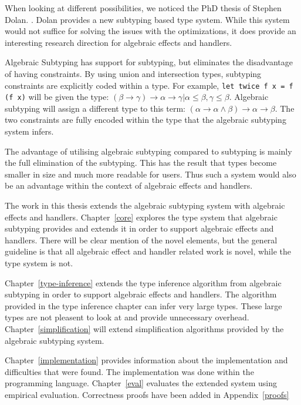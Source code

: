 When looking at different possibilities, we noticed the PhD thesis of Stephen Dolan. \cite{dolan2017algebraic}. Dolan provides a new subtyping based type system. While this system would not suffice for solving the issues with the optimizations, it does provide an interesting research direction for algebraic effects and handlers. 

Algebraic Subtyping has support for subtyping, but eliminates the disadvantage of having constraints. By using union and intersection types, subtyping constraints are explicitly coded within a type. For example, \lstinline{let twice f x = f (f x)} will be given the type: $(\beta \to \gamma) \to \alpha \to \gamma | \alpha \le \beta, \gamma \le \beta$. Algebraic subtyping will assign a different type to this term: $(\alpha \to \alpha \land \beta) \to \alpha \to \beta$. The two constraints are fully encoded within the type that the algebraic subtyping system infers. 

The advantage of utilising algebraic subtyping compared to subtyping is mainly the full elimination of the subtyping. This has the result that types become smaller in size and much more readable for users. Thus such a system would also be an advantage within the context of algebraic effects and handlers. 

The work in this thesis extends the algebraic subtyping system with algebraic effects and handlers. Chapter~\ref{core} explores the type system that algebraic subtyping provides and extends it in order to support algebraic effects and handlers. There will be clear mention of the novel elements, but the general guideline is that all algebraic effect and handler related work is novel, while the type system is not. 

Chapter~\ref{type-inference} extends the type inference algorithm from algebraic subtyping in order to support algebraic effects and handlers. The algorithm provided in the type inference chapter can infer very large types. These large types are not pleasent to look at and provide unnecessary overhead. Chapter~\ref{simplification} will extend simplification algorithms provided by the algebraic subtyping system. 

Chapter~\ref{implementation} provides information about the implementation and difficulties that were found. The implementation was done within the \eff programming language. Chapter~\ref{eval} evaluates the extended system using empirical evaluation. Correctness proofs have been added in Appendix~\ref{proofs}